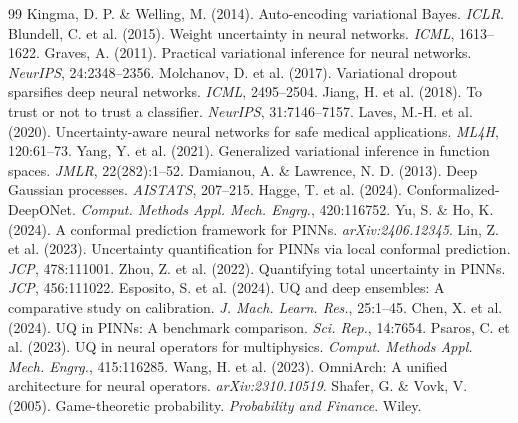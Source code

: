 \documentclass[12pt,a4paper]{article}
\theoremstyle{plain}
\begin{document}
\begin{thebibliography}{99}
     Kingma, D. P. \& Welling, M. (2014). Auto-encoding variational Bayes. \textit{ICLR}.
     Blundell, C. et al. (2015). Weight uncertainty in neural networks. \textit{ICML}, 1613--1622.
     Graves, A. (2011). Practical variational inference for neural networks. \textit{NeurIPS}, 24:2348--2356.
     Molchanov, D. et al. (2017). Variational dropout sparsifies deep neural networks. \textit{ICML}, 2495--2504.
     Jiang, H. et al. (2018). To trust or not to trust a classifier. \textit{NeurIPS}, 31:7146--7157.
     Laves, M.-H. et al. (2020). Uncertainty-aware neural networks for safe medical applications. \textit{ML4H}, 120:61--73.
     Yang, Y. et al. (2021). Generalized variational inference in function spaces. \textit{JMLR}, 22(282):1--52.
     Damianou, A. \& Lawrence, N. D. (2013). Deep Gaussian processes. \textit{AISTATS}, 207--215.
     Hagge, T. et al. (2024). Conformalized-DeepONet. \textit{Comput. Methods Appl. Mech. Engrg.}, 420:116752.
     Yu, S. \& Ho, K. (2024). A conformal prediction framework for PINNs. \textit{arXiv:2406.12345}.
     Lin, Z. et al. (2023). Uncertainty quantification for PINNs via local conformal prediction. \textit{JCP}, 478:111001.
     Zhou, Z. et al. (2022). Quantifying total uncertainty in PINNs. \textit{JCP}, 456:111022.
     Esposito, S. et al. (2024). UQ and deep ensembles: A comparative study on calibration. \textit{J. Mach. Learn. Res.}, 25:1--45.
     Chen, X. et al. (2024). UQ in PINNs: A benchmark comparison. \textit{Sci. Rep.}, 14:7654.
     Psaros, C. et al. (2023). UQ in neural operators for multiphysics. \textit{Comput. Methods Appl. Mech. Engrg.}, 415:116285.
     Wang, H. et al. (2023). OmniArch: A unified architecture for neural operators. \textit{arXiv:2310.10519}.
     Shafer, G. \& Vovk, V. (2005). Game-theoretic probability. \textit{Probability and Finance}. Wiley.

\end{thebibliography}
\end{document}
